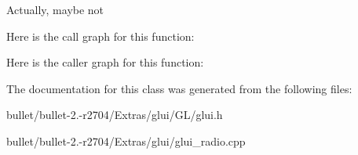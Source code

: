 Actually, maybe not 

Here is the call graph for this function\+:




Here is the caller graph for this function\+:




The documentation for this class was generated from the following files\+:\begin{DoxyCompactItemize}
\item 
bullet/bullet-\/2.-\/r2704/\+Extras/glui/\+G\+L/glui.\+h\item 
bullet/bullet-\/2.-\/r2704/\+Extras/glui/glui\+\_\+radio.\+cpp\end{DoxyCompactItemize}
